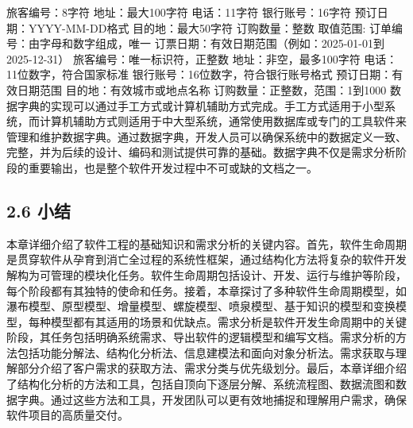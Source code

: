 旅客编号：8字符 地址：最大100字符 电话：11字符 银行账号：16字符 预订日期：YYYY-MM-DD格式 目的地：最大50字符 订购数量：整数 取值范围: 订单编号：由字母和数字组成，唯一 订票日期：有效日期范围（例如：2025-01-01到2025-12-31） 旅客编号：唯一标识符，正整数 地址：非空，最多100字符 电话：11位数字，符合国家标准 银行账号：16位数字，符合银行账号格式 预订日期：有效日期范围 目的地：有效城市或地点名称 订购数量：正整数，范围：1到1000 数据字典的实现可以通过手工方式或计算机辅助方式完成。手工方式适用于小型系统，而计算机辅助方式则适用于中大型系统，通常使用数据库或专门的工具软件来管理和维护数据字典。通过数据字典，开发人员可以确保系统中的数据定义一致、完整，并为后续的设计、编码和测试提供可靠的基础。数据字典不仅是需求分析阶段的重要输出，也是整个软件开发过程中不可或缺的文档之一。

\subsection{2.6 小结}\label{ux5c0fux7ed3} 本章详细介绍了软件工程的基础知识和需求分析的关键内容。首先，软件生命周期是贯穿软件从孕育到消亡全过程的系统性框架，通过结构化方法将复杂的软件开发解构为可管理的模块化任务。软件生命周期包括设计、开发、运行与维护等阶段，每个阶段都有其独特的使命和任务。接着，本章探讨了多种软件生命周期模型，如瀑布模型、原型模型、增量模型、螺旋模型、喷泉模型、基于知识的模型和变换模型，每种模型都有其适用的场景和优缺点。需求分析是软件开发生命周期中的关键阶段，其任务包括明确系统需求、导出软件的逻辑模型和编写文档。需求分析的方法包括功能分解法、结构化分析法、信息建模法和面向对象分析法。需求获取与理解部分介绍了客户需求的获取方法、需求分类与优先级划分。最后，本章详细介绍了结构化分析的方法和工具，包括自顶向下逐层分解、系统流程图、数据流图和数据字典。通过这些方法和工具，开发团队可以更有效地捕捉和理解用户需求，确保软件项目的高质量交付。
